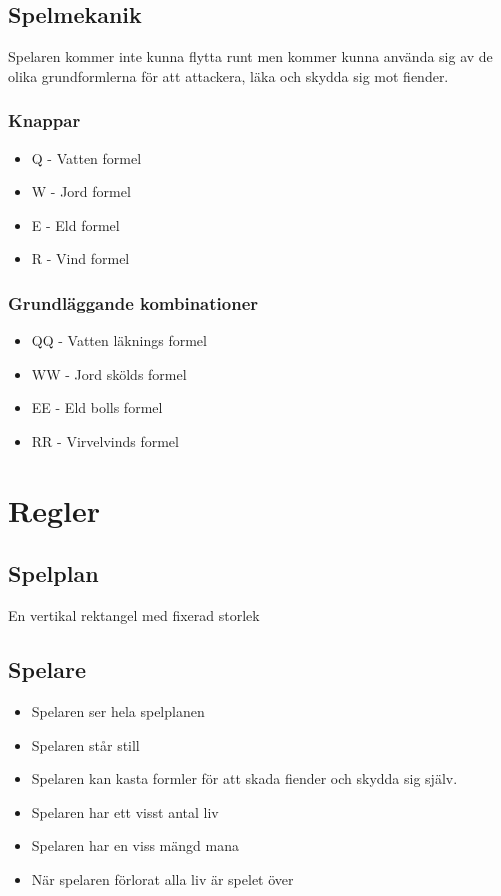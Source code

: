 \documentclass[12pt]{TDP005mall}
\begin{document}
\subsection{Spelmekanik}
Spelaren kommer inte kunna flytta runt men kommer kunna använda sig av de olika grundformlerna för att attackera, läka och skydda sig mot fiender.

\subsubsection{Knappar}
\begin{itemize}
\item Q - Vatten formel
\item W - Jord formel
\item E - Eld formel
\item R - Vind formel
\end{itemize}

\subsubsection{Grundläggande kombinationer}
\begin{itemize}
\item QQ - Vatten läknings formel
\item WW - Jord skölds formel
\item EE - Eld bolls formel
\item RR - Virvelvinds formel
\end{itemize}


\section{Regler}
\subsection{Spelplan}
En vertikal rektangel med fixerad storlek
\subsection{Spelare}
\begin{itemize}
\item Spelaren ser hela spelplanen
\item Spelaren står still
\item Spelaren kan kasta formler för att skada fiender och skydda sig själv.
\item Spelaren har ett visst antal liv
\item Spelaren har en viss mängd mana
\item När spelaren förlorat alla liv är spelet över
\end{itemize}
\end{document}
